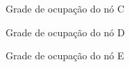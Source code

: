 \documentclass{llncs}
\begin{document}
\begin{figure}
	\centering
	\caption{Grade de ocupação do nó C}
	\label{fig:grade_no_C}
\end{figure}
\begin{figure}
	\centering
	\caption{Grade de ocupação do nó D}
	\label{fig:grade_no_D}
\end{figure}
\begin{figure}
	\centering
	\caption{Grade de ocupação do nó E}
	\label{fig:grade_no_E}
\end{figure}
\end{document}
